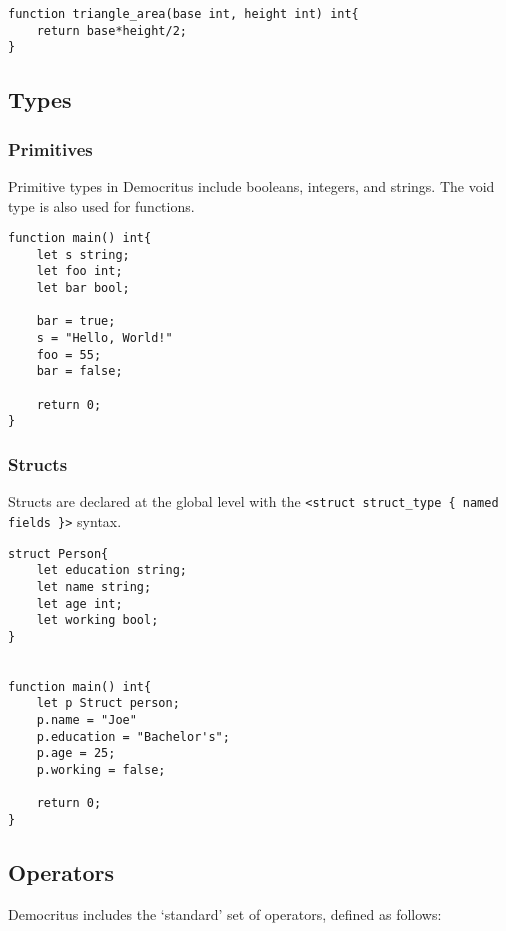 	\begin{lstlisting}
function triangle_area(base int, height int) int{
	return base*height/2;
}
	\end{lstlisting}

	\subsection{Types}

		\subsubsection{Primitives}
		Primitive types in Democritus include booleans, integers, and strings. The void type is also used for functions.

		\begin{lstlisting}
function main() int{
	let s string;
	let foo int;
	let bar bool;

	bar = true;
	s = "Hello, World!"
	foo = 55;
	bar = false;

	return 0;
}
		\end{lstlisting}


	 	\subsubsection{Structs}
	 	Structs are declared at the global level with the \texttt{<struct struct\_type \{ named fields \}>} syntax. 

	 	\begin{lstlisting}
struct Person{
	let education string;
	let name string;
	let age int;
	let working bool;
}


function main() int{
	let p Struct person;
	p.name = "Joe"
	p.education = "Bachelor's";
	p.age = 25;
	p.working = false;

	return 0;
}
	 	\end{lstlisting}


	\iffalse
	\subsection{Modifiers}
		Information about atomic and pointers here.
	\fi

 	\subsection{Operators}
		
		Democritus includes the `standard' set of operators, defined as follows:

